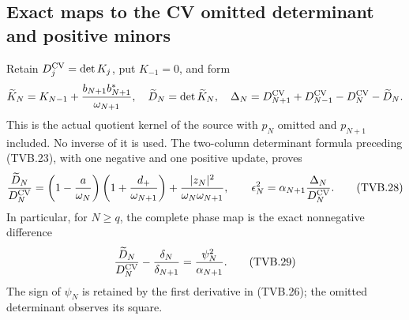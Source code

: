 \subsection{Exact maps to the CV omitted determinant and positive minors}

Retain $D_j^{\rm CV}=\det K_j$, put $K_{-1}=0$, and form
\[
 \widetilde K_N=K_{N-1}
        +\frac{b_{N+1}b_{N+1}^*}{\omega_{N+1}},\quad
 \widetilde D_N=\det\widetilde K_N,\quad
 \Delta_N=D_{N+1}^{\rm CV}+D_{N-1}^{\rm CV}
                         -D_N^{\rm CV}-\widetilde D_N.
\]
This is the actual quotient kernel of the source with $p_N$
omitted and $p_{N+1}$ included. No inverse of it is used.
The two-column determinant formula preceding (TVB.23), with one
negative and one positive update, proves
\[
 \frac{\widetilde D_N}{D_N^{\rm CV}}
 =\left(1-\frac a{\omega_N}\right)
       \left(1+\frac{d_+}{\omega_{N+1}}\right)
        +\frac{|z_N|^2}{\omega_N\omega_{N+1}},\qquad
 \epsilon_N^2=\alpha_{N+1}\frac{\Delta_N}{D_N^{\rm CV}}.
 \tag{TVB.28}
\]
In particular, for $N\ge q$, the complete phase map is the exact
nonnegative difference
\[
 \frac{\widetilde D_N}{D_N^{\rm CV}}
 -\frac{\delta_N}{\delta_{N+1}}
 =\frac{\psi_N^2}{\alpha_{N+1}}.
 \tag{TVB.29}
\]
The sign of $\psi_N$ is retained by the first derivative in
(TVB.26); the omitted determinant observes its square.

